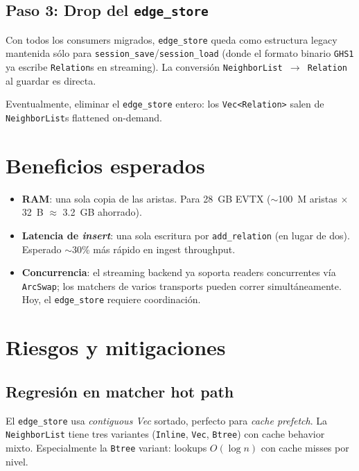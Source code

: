 \subsection{Paso 3: Drop del \texttt{edge\_store}}

Con todos los consumers migrados, \texttt{edge\_store} queda como
estructura legacy mantenida sólo para
\texttt{session\_save}/\texttt{session\_load} (donde el formato
binario \texttt{GHS1} ya escribe \texttt{Relation}s en streaming).
La conversión \texttt{NeighborList $\to$ Relation} al guardar es
directa.

Eventualmente, eliminar el \texttt{edge\_store} entero: los
\texttt{Vec<Relation>} salen de \texttt{NeighborList}s flattened
on-demand.

\section{Beneficios esperados}

\begin{itemize}
    \item \textbf{RAM}: una sola copia de las aristas. Para 28~GB
    EVTX ($\sim$100~M aristas \(\times\) 32~B $\approx$ 3.2~GB
    ahorrado).
    \item \textbf{Latencia de \emph{insert}}: una sola escritura
    por \texttt{add\_relation} (en lugar de dos). Esperado
    $\sim$30\% más rápido en ingest throughput.
    \item \textbf{Concurrencia}: el streaming backend ya soporta
    readers concurrentes vía \texttt{ArcSwap}; los matchers de
    varios transports pueden correr simultáneamente. Hoy, el
    \texttt{edge\_store} requiere coordinación.
\end{itemize}

\section{Riesgos y mitigaciones}

\subsection{Regresión en matcher hot path}

El \texttt{edge\_store} usa \emph{contiguous Vec} sortado, perfecto
para \emph{cache prefetch}. La \texttt{NeighborList} tiene tres
variantes (\texttt{Inline}, \texttt{Vec}, \texttt{Btree}) con cache
behavior mixto. Especialmente la \texttt{Btree} variant: lookups
\(O(\log n)\) con cache misses por nivel.

